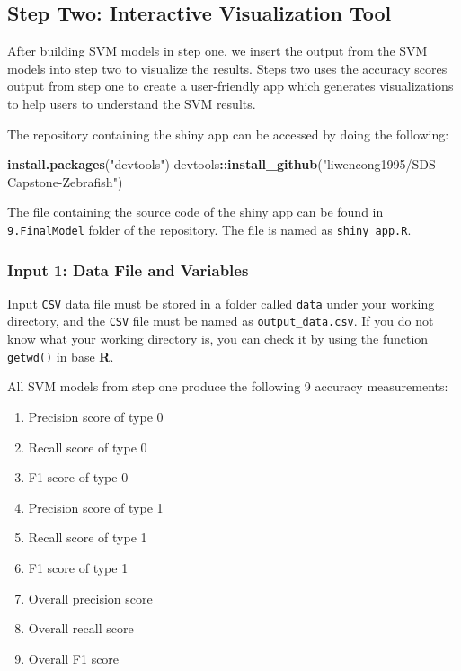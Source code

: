 \documentclass[10pt,letterpaper]{article}
\newenvironment{Shaded}{\begin{snugshade}}{\end{snugshade}}
\newcommand{\KeywordTok}[1]{\textcolor[rgb]{0.13,0.29,0.53}{\textbf{#1}}}
\newcommand{\StringTok}[1]{\textcolor[rgb]{0.31,0.60,0.02}{#1}}
\newcommand{\OperatorTok}[1]{\textcolor[rgb]{0.81,0.36,0.00}{\textbf{#1}}}
\newcommand{\NormalTok}[1]{#1}
\providecommand{\tightlist}{%
  \setlength{\itemsep}{0pt}\setlength{\parskip}{0pt}}
\begin{document}
\subsection{Step Two: Interactive Visualization
Tool}\label{step-two-interactive-visualization-tool}

After building SVM models in step one, we insert the output from the SVM
models into step two to visualize the results. Steps two uses the
accuracy scores output from step one to create a user-friendly app which
generates visualizations to help users to understand the SVM results.

The repository containing the shiny app can be accessed by doing the
following:

\begin{Shaded}
\begin{Highlighting}[]
\KeywordTok{install.packages}\NormalTok{(}\StringTok{"devtools"}\NormalTok{)}
\NormalTok{devtools}\OperatorTok{::}\KeywordTok{install_github}\NormalTok{(}\StringTok{"liwencong1995/SDS-Capstone-Zebrafish"}\NormalTok{)}
\end{Highlighting}
\end{Shaded}

The file containing the source code of the shiny app can be found in
\texttt{9.FinalModel} folder of the repository. The file is named as
\texttt{shiny\_app.R}.

\subsubsection{Input 1: Data File and
Variables}\label{input-1-data-file-and-variables}

Input \texttt{CSV} data file must be stored in a folder called
\texttt{data} under your working directory, and the \texttt{CSV} file
must be named as \texttt{output\_data.csv}. If you do not know what your
working directory is, you can check it by using the function
\texttt{getwd()} in base \textbf{R}.

All SVM models from step one produce the following 9 accuracy
measurements:

\begin{enumerate}
\def\labelenumi{\arabic{enumi}.}
\tightlist
\item
  Precision score of type 0
\item
  Recall score of type 0
\item
  F1 score of type 0
\item
  Precision score of type 1
\item
  Recall score of type 1
\item
  F1 score of type 1
\item
  Overall precision score
\item
  Overall recall score
\item
  Overall F1 score
\end{enumerate}
\end{document}
